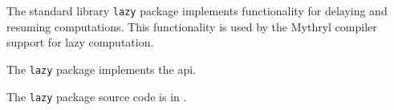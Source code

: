 
The standard library {\tt lazy} package implements functionality for delaying 
and resuming computations.  This functionality is used by the Mythryl compiler support 
for lazy computation.

The {\tt lazy} package implements the 
 api.

The {\tt lazy} package source code is in .

